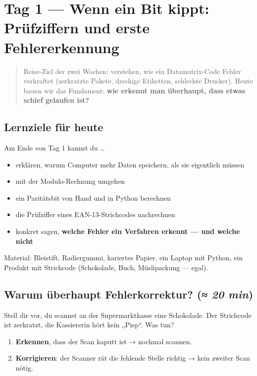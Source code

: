 \chapter{Tag 1 — Wenn ein Bit kippt: Prüfziffern und erste Fehlererkennung}

\begin{quote}
Reise-Ziel der zwei Wochen: verstehen, wie ein Datamatrix-Code Fehler
verkraftet (zerkratzte Pakete, dreckige Etiketten, schlechte Drucker).
Heute bauen wir das Fundament: \textbf{wie erkennt man überhaupt, dass
etwas schief gelaufen ist?}
\end{quote}

\section*{Lernziele für heute}

Am Ende von Tag 1 kannst du \dots

\begin{itemize}
\item erklären, warum Computer mehr Daten speichern, als sie eigentlich müssen
\item mit der Modulo-Rechnung umgehen
\item ein Paritätsbit von Hand und in Python berechnen
\item die Prüfziffer eines EAN-13-Strichcodes nachrechnen
\item konkret sagen, \textbf{welche Fehler ein Verfahren erkennt — und welche nicht}
\end{itemize}

Material: Bleistift, Radiergummi, kariertes Papier, ein Laptop mit
Python, ein Produkt mit Strichcode (Schokolade, Buch, Müslipackung —
egal).

\section{Warum überhaupt Fehlerkorrektur? \normalfont(\textit{≈ 20 min})}

Stell dir vor, du scannst an der Supermarktkasse eine Schokolade. Der
Strichcode ist zerkratzt, die Kassiererin hört kein „Piep“. Was tun?

\begin{enumerate}
\item \textbf{Erkennen}, dass der Scan kaputt ist → nochmal scannen.
\item \textbf{Korrigieren}: der Scanner rät die fehlende Stelle richtig
  → kein zweiter Scan nötig.
\end{enumerate}

